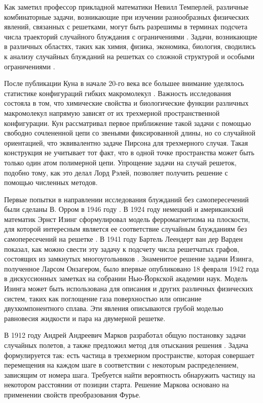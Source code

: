 Как заметил профессор прикладной математики Невилл Темперлей, различные комбинаторные задачи, возникающие при изучении разнообразных физических явлений, связанных с решетками, могут быть разрешимы в терминах подсчета числа траекторий случайного блуждания с ограничениями \cite{temperley_combinatorial_1956}. Задачи, возникающие в различных областях, таких как химия, физика, экономика, биология, сводились к анализу случайных блужданий на решетках со сложной структурой и особыми ограничениями \cite{kuhn_uber_1930, flory_principles_1953, gee_interaction_1946, ising_beitrag_1925, tricomi_funzioni_1954}. 

После публикации Куна в начале 20-го века все большее внимание уделялось статистике конфигураций гибких макромолекул \cite{kuhn_uber_1930}. Важность исследования состояла в том, что химические свойства и биологические функции различных макромолекул напрямую зависят от их трехмерной пространственной конфигурации. Кун рассматривал первое приближение такой задачи с помощью свободно сочлененной цепи со звеньями фиксированной длины, но со случайной ориентацией, что эквивалентно задаче Пирсона для трехмерного случая. Такая конструкция не учитывает тот факт, что в одной точке пространства может быть только один атом полимерной цепи. Упрощение задачи на случай решеток, подобно тому, как это делал Лорд Рэлей, позволяет получить решение с помощью численных методов.

Первые попытки в направлении исследования блужданий без самопересечений были сделаны В. Орром в 1946 году \cite{gee_interaction_1946}. В 1924 году немецкий и американский математик Эрнст Изинг сформулировал модель ферромагнетизма на плоскости, для которой интересным является ее соответствие случайным блужданиям без самопересечений на решетке \cite{ising_beitrag_1925}. В 1941 году Бартель Леендерт ван дер Варден показал, как можно свести эту задачу к подсчету числа решетчатых графов, состоящих из замкнутых многоугольников \cite{van_der_waerden_lange_1941}. Знаменитое решение задачи Изинга, полученное Ларсом Онзагером, было впервые опубликовано 18 февраля 1942 года в дискуссионных заметках на собрании Нью-Йоркской академии наук. Модель Изинга может быть использована для описания и других различных физических систем, таких как поглощение газа поверхностью или описание двухкомпонентного сплава. Эти явления описываются грубой моделью равновесия жидкости и пара на двумерной решетке.

В 1912 году Андрей Андреевич Марков разработал общую постановку задачи случайных полетов, а также предложил метод для отыскания решения \cite{markov_wahrscheinlichkeitsrechnung_1912}. Задача формулируется так: есть частица в трехмерном пространстве, которая совершает перемещения на каждом шаге в соответствии с некоторым распределением, зависящим от номера шага. Требуется найти вероятность обнаружить частицу на некотором расстоянии от позиции старта. Решение Маркова основано на применении свойств преобразования Фурье.

